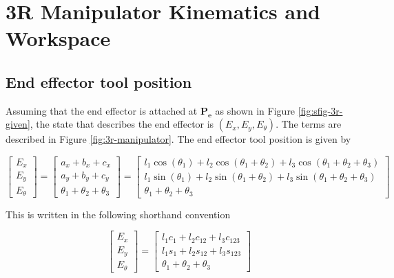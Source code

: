 
\section[A2: 3R Planar Robot]{3R Manipulator Kinematics and Workspace}

\subsection[A2.1: End effector position]{End effector tool position}

Assuming that the end effector is attached at $\mathbf{P_e}$ as shown in Figure \ref{fig:sfig-3r-given}, the state that describes the end effector is $(E_x, E_y, E_{\theta})$. The terms are described in Figure \ref{fig:3r-manipulator}. The end effector tool position is given by

\begin{equation}
    \begin{bmatrix}
    E_x \\ E_y \\ E_{\theta}
    \end{bmatrix} = \begin{bmatrix}
    a_x + b_x + c_x \\
    a_y + b_y + c_y \\
    \theta_1 + \theta_2 + \theta_3
    \end{bmatrix} = \begin{bmatrix}
    l_1 \cos(\theta_1) + l_2 \cos(\theta_1 + \theta_2) + l_3 \cos(\theta_1 + \theta_2 + \theta_3) \\
    l_1 \sin(\theta_1) + l_2 \sin(\theta_1 + \theta_2) + l_3 \sin(\theta_1 + \theta_2 + \theta_3) \\
    \theta_1 + \theta_2 + \theta_3
    \end{bmatrix}
\end{equation}

This is written in the following shorthand convention

\begin{equation}
    \begin{bmatrix}
    E_x \\ E_y \\ E_{\theta}
    \end{bmatrix} = \begin{bmatrix}
    l_1 c_1 + l_2 c_{12} + l_3 c_{123} \\
    l_1 s_1 + l_2 s_{12} + l_3 s_{123} \\
    \theta_1 + \theta_2 + \theta_3
    \end{bmatrix}
    \label{eq:3r-fk-equation}
\end{equation}

